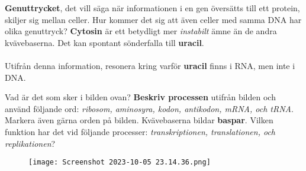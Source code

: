 \documentclass{exam}
\begin{document}
\vspace{5mm} %
\begin{questions}
\question 
\textbf{Genuttrycket}, det vill säga när informationen i en gen översätts till ett protein, skiljer sig mellan celler. Hur kommer det sig att även celler med samma DNA har olika genuttryck? 
\vspace{80mm} %
\question 
\textbf{Cytosin} är ett betydligt mer \textit{instabilt} ämne än de andra kvävebaserna. Det kan spontant sönderfalla till \textbf{uracil}.
\\ \\
Utifrån denna information, resonera kring varför \textbf{uracil} finns i RNA, men inte i DNA. 

\break
\vspace{10mm} %
\question 
Vad är det som sker i bilden ovan? \textbf{Beskriv processen} utifrån bilden och använd följande ord: \textit{ribosom, aminosyra, kodon, antikodon, mRNA, och tRNA}. Markera även gärna orden på bilden.
\vspace{80mm} %
\question 
Kvävebaserna bildar \textbf{baspar}. Vilken funktion har det vid följande processer: \textit{transkriptionen, translationen, och replikationen}?
\begin{figure}
    \centering
    \texttt{[image: Screenshot 2023-10-05 23.14.36.png]}
    
    
\end{figure}




\end{questions}
\end{document}
